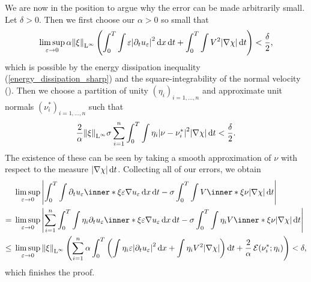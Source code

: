 We are now in the position to argue why the error can be made arbitrarily 
small. 
Let $ \delta > 0 $. Then we first choose our $ \alpha > 0 $ so small that 
\begin{equation*}
	\limsup_{ \varepsilon \to 0 }
	\alpha \norm{ \xi }_{ \operatorname{L}^{ \infty } }
	\left(
	\int_{ 0 }^{ T }
	\int
	\varepsilon 
	\abs{ \partial_{  t } u_{ \varepsilon } }^{ 2 }
	\dd{ x }
	\dd{ t }
	+
	\int_{ 0 }^{ T }
	\int
	V^{ 2 }
	\abs{ \nabla \chi }
	\dd{ t }
	\right)
	<
	\frac{ \delta }{ 2 },
\end{equation*}
which is possible by the energy dissipation inequality 
(\ref{energy_dissipation_sharp}) and the square-integrability of the normal 
velocity ().
Then we choose a partition of unity $ \left( \eta_{ i } \right)_{ i = 1 , 
\dotsc , n } $ and approximate unit normals $ \left( \nu^{ \ast }_{ i 
}\right)_{i = 1 , \dotsc, n } $ such that
\begin{equation*}
	\frac{ 2 }{ \alpha }
	\norm{ \xi }_{ \operatorname{L}^{ \infty } }
	\sigma
	\sum_{ i = 1 }^{ n }
	\int_{ 0 }^{ T }
	\int
	\eta_{ i }
	\abs{ \nu - \nu_{ i }^{ \ast } }^{ 2 }
	\abs{ \nabla \chi }
	\dd{ t }
	<
	\frac{ \delta }{2 }.
\end{equation*}
The existence of these can be seen by taking a smooth approximation of $ \nu $ 
with respect to the measure $ \abs{ \nabla \chi } \dd{ t } $.
Collecting all of our errors, we obtain
\begin{align*}
	& \limsup_{ \varepsilon \to 0 }
	\abs{
		\int_{ 0 }^{ T }
		\int
		\partial_{  t } u_{ \varepsilon }
		\inner*{ \xi }{ \varepsilon \nabla u_{ \varepsilon } }
		\dd{ x }
		\dd{ t }
		-
		\sigma
		\int_{ 0 }^{ T }
		\int
		V \inner*{ \xi }{ \nu }
		\abs{ \nabla \chi }
		\dd{ t }
	}
	\\
	= {} &
	\limsup_{ \varepsilon \to 0 }
	\abs{
		\sum_{ i = 1 }^{ n }
		\int_{ 0 }^{ T }
		\int
		\eta_{ i }
		\partial_{  t } u_{ \varepsilon }
		\inner*{ \xi }{ \varepsilon \nabla u_{ \varepsilon } }
		\dd{ x }
		\dd{ t }
		-
		\sigma
		\int_{ 0 }^{ T }
		\int
		\eta_{ i }
		V \inner*{ \xi }{ \nu }
		\abs{ \nabla \chi }
		\dd{ t }
	}
	\\
	\leq {} & 
	\limsup_{ \varepsilon \to 0 }
	\norm{ \xi }_{ \lp^{ \infty } }
	\left(
	\sum_{ i = 1 }^{ n } 
	\alpha 
	\int_{ 0 }^{ T }
	\left(
	\int
	\eta_{ i }
	\varepsilon
	\abs{ \partial_{  t } u_{ \varepsilon } }^{ 2 }
	\dd{ x }
	+
	\int
	\eta_{ i }
	V^{ 2 }
	\abs{ \nabla \chi }
	\right)
	\dd{ t }
	+
	\frac{ 2 }{ \alpha }
	\tilt_excess ( \nu_{ i }^{ \ast } ; \eta_{ i } )
	\right)
	< \delta,
\end{align*}
which finishes the proof.